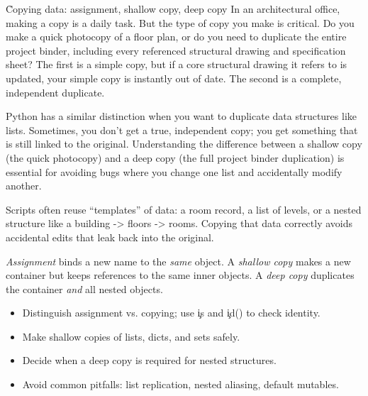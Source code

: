 
\h{Copying data: assignment, shallow copy, deep copy}
In an architectural office, making a copy is a daily task. But the type of copy you make is critical. Do you make a quick photocopy of a floor plan, or do you need to duplicate the entire project binder, including every referenced structural drawing and specification sheet? The first is a simple copy, but if a core structural drawing it refers to is updated, your simple copy is instantly out of date. The second is a complete, independent duplicate.

Python has a similar distinction when you want to duplicate data structures like lists. Sometimes, you don't get a true, independent copy; you get something that is still linked to the original. Understanding the difference between a shallow copy (the quick photocopy) and a deep copy (the full project binder duplication) is essential for avoiding bugs where you change one list and accidentally modify another.

Scripts often reuse “templates” of data: a room record, a list of levels, or a nested structure like a building -> floors -> rooms. Copying that data correctly avoids accidental edits that leak back into the original.

\begin{NoteBox}
\emph{Assignment} binds a new name to the \emph{same} object. 
A \emph{shallow copy} makes a new container but keeps references to the same inner objects. 
A \emph{deep copy} duplicates the container \emph{and} all nested objects.
\end{NoteBox}

\begin{tcolorbox}[%
    title=Focus of this chapter:,
    colframe=orange,
    colback = white,
    arc=2mm %
 ]
\begin{itemize}
  \item Distinguish assignment vs. copying; use \c{is} and \c{id()} to check identity.
  \item Make shallow copies of lists, dicts, and sets safely.
  \item Decide when a deep copy is required for nested structures.
  \item Avoid common pitfalls: list replication, nested aliasing, default mutables.
\end{itemize}
\end{tcolorbox}

